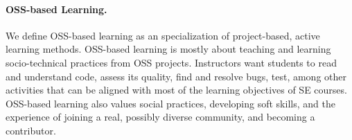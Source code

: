 \documentclass[sigconf]{acmart}
\begin{document}
\paragraph{OSS-based Learning.}
We define OSS-based learning as an specialization of project-based, active learning methods.
%
OSS-based learning is mostly about teaching and learning socio-technical practices from OSS projects.
Instructors want students to read and understand code, assess its quality, find and resolve bugs, test, among other activities that can be aligned with most of the learning objectives of SE courses. 
OSS-based learning also values social practices, developing soft skills, and the experience of joining a real, possibly diverse community, and becoming a contributor.

\end{document}
